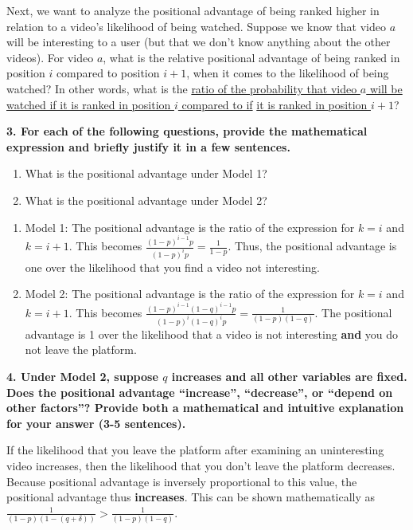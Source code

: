 \documentclass{article}
\begin{document}
Next, we want to analyze the positional advantage of being ranked higher in relation to a video's likelihood of being watched. Suppose we know that video $a$ will be interesting to a user (but that we don't know anything about the other videos). For video $a$, what is the relative positional advantage of being ranked in position $i$ compared to position $i+1$, when it comes to the likelihood of being watched? In other words, what is the \underline{ratio of the probability that video $a$ will be watched if it is ranked in position $i$ compared to if} \underline{it is ranked in position $i+1$}?


\textbf{3. For each of the following questions, provide the mathematical expression and briefly justify it in a few sentences.}
\begin{enumerate}[label=\Alph*.]
    \item What is the positional advantage under Model 1?
    \item What is the positional advantage under Model 2?
\end{enumerate}

\bigskip
\begin{mdframed}
\begin{enumerate}[label=\Alph*.]
    \item Model 1: The positional advantage is the ratio of the expression for $k=i$ and $k=i+1$. This becomes $\frac{(1-p)^{i-1}p}{(1-p)^{i}p} = \frac{1}{1-p}$. Thus, the positional advantage is one over the likelihood that you find a video not interesting.
    \item Model 2: The positional advantage is the ratio of the expression for $k=i$ and $k=i+1$. This becomes $\frac{(1-p)^{i-1}(1-q)^{i-1}p}{(1-p)^{i}(1-q)^{i}p} = \frac{1}{(1-p)(1-q)}$. The positional advantage is 1 over the likelihood that a video is not interesting \textbf{and} you do not leave the platform. 
\end{enumerate}
\end{mdframed}
\bigskip

\textbf{4. Under Model 2, suppose $q$ increases and all other variables are fixed. Does the positional advantage ``increase'', ``decrease'', or ``depend on other factors''? Provide both a mathematical and intuitive explanation for your answer (3-5 sentences).}

\bigskip
\begin{mdframed}
If the likelihood that you leave the platform after examining an uninteresting video increases, then the likelihood that you don't leave the platform decreases. Because positional advantage is inversely proportional to this value, the positional advantage thus \textbf{increases}. This can be shown mathematically as $\frac{1}{(1-p)(1-(q+\delta))} > \frac{1}{(1-p)(1-q)}$.
\end{mdframed}
\end{document}
